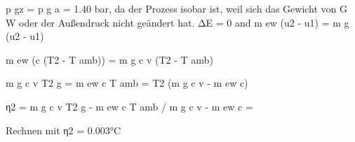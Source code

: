 p gz = p g a = 1.40 bar, da der Prozess isobar ist, weil sich das Gewicht von G W oder der Außendruck nicht geändert hat.  
ΔE = 0 and m ew (u2 - u1) = m g (u2 - u1)  

m ew (c (T2 - T amb)) = m g c v (T2 - T amb)  

m g c v T2 g = m ew c T amb = T2 (m g c v - m ew c)  

η2 = m g c v T2 g - m ew c T amb / m g c v - m ew c =  

Rechnen mit η2 = 0.003°C
